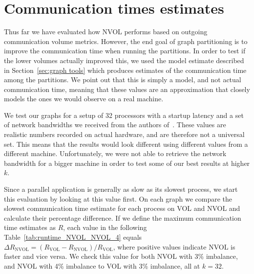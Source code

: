 \section{Communication times estimates}\label{sec:model estimates results}
Thus far we have evaluated how NVOL performs based on outgoing communication volume metrics. However, the end goal of graph partitioning is to improve the communication time when running the partitions. In order to test if the lower volumes actually improved this, we used the model estimate described in Section~\ref{sec:graph tools} which produces estimates of the communication time among the partitions. We point out that this is simply a model, and not actual communication time, meaning that these values are an approximation that closely models the ones we would observe on a real machine. 

We test our graphs for a setup of 32 processors with a startup latency and a set of network bandwidths we received from the authors of~\cite{Xing_of_Heterogeneous}. These values are realistic numbers recorded on actual hardware, and are therefore not a universal set. This means that the results would look different using different values from a different machine. Unfortunately, we were not able to retrieve the network bandwidth for a bigger machine in order to test some of our best results at higher $k$. 

Since a parallel application is generally as slow as its slowest process, we start this evaluation by looking at this value first. On each graph we compare the slowest communication time estimate for each process on VOL and NVOL and calculate their percentage difference. If we define the maximum communication time estimates as $R$, each value in the following Table~\ref{tab:runtime_NVOL_NVOL_4} equals $\Delta R_{\mathrm{NVOL}} = (R_{\mathrm{VOL}} - R_{\mathrm{NVOL}})/ R_{\mathrm{VOL}}$, where positive values indicate NVOL is faster and vice versa. We check this value for both NVOL with 3\% imbalance, and NVOL with 4\% imbalance to VOL with 3\% imbalance, all at $k=32$. 
 
